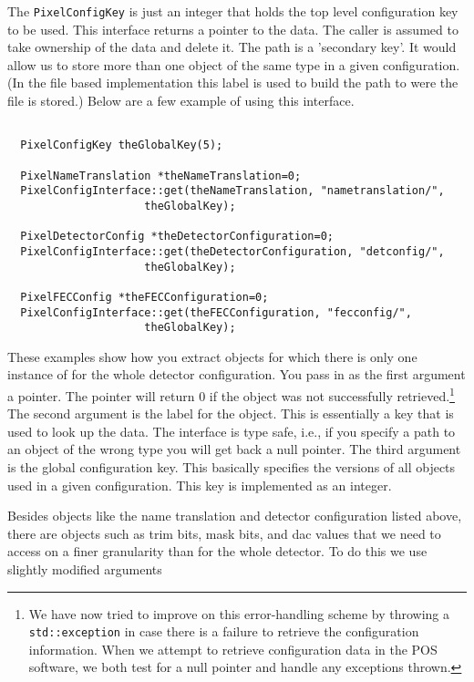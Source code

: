 The {\tt PixelConfigKey} is just an integer that holds the top
level configuration key to be used. 
This interface returns a pointer to the data. The caller is assumed
to take ownership of the data and delete it. 
The path is a 'secondary key'. It would allow us to store more than
one object of the same type in a given configuration. (In the file
based implementation this label is used to build the path to were the
file is stored.)
Below are a few example of using this interface.
\begin{verbatim}

  PixelConfigKey theGlobalKey(5);

  PixelNameTranslation *theNameTranslation=0;
  PixelConfigInterface::get(theNameTranslation, "nametranslation/", 
                     theGlobalKey);

  PixelDetectorConfig *theDetectorConfiguration=0;
  PixelConfigInterface::get(theDetectorConfiguration, "detconfig/", 
                     theGlobalKey);

  PixelFECConfig *theFECConfiguration=0;
  PixelConfigInterface::get(theFECConfiguration, "fecconfig/", 
                     theGlobalKey);

\end{verbatim}

These examples show how you extract objects for which there is only one 
instance of for the
whole detector configuration. You pass in as the first argument a pointer. The 
pointer will return 0 if the object was not successfully retrieved.\footnote{We have now tried to improve on this error-handling scheme by throwing a {\tt std::exception} in case there is a failure to retrieve the configuration information. When we attempt to retrieve configuration data in the POS software, we both test for a null pointer and handle any exceptions thrown.} The
second argument is the label for the object. This is essentially a key that
is used to look up the data. The interface is type safe, i.e., if you specify 
a path to an object of the wrong type you will get back a null pointer. The
third argument is the global configuration key. This basically specifies 
the versions of all objects used in a given configuration. This key is
implemented as an integer.

Besides objects like the name translation and detector configuration listed
above, there are objects such as trim bits, mask bits, and dac values 
that we need
to access on a finer granularity than for the whole detector. To do this
we use slightly modified arguments

